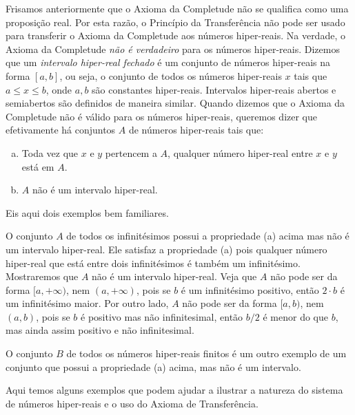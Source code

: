 Frisamos anteriormente que o Axioma da Completude não se qualifica como
uma proposição real. Por esta razão, o Princípio da Transferência não
pode ser usado para transferir o Axioma da Completude aos números
hiper-reais. Na verdade, o Axioma da Completude \emph{não é verdadeiro}
para os números hiper-reais. Dizemos que um \emph{intervalo hiper-real
fechado} é um conjunto de números hiper-reais na forma $[a,b]$, ou seja,
o conjunto de todos os números hiper-reais $x$ tais que $a \le x \le b$,
onde $a, b$ são constantes hiper-reais. Intervalos hiper-reais abertos
e semiabertos são definidos de maneira similar. Quando dizemos que o
Axioma da Completude não é válido para os números hiper-reais, queremos
dizer que efetivamente há conjuntos $A$ de números hiper-reais tais que:

\begin{enumerate}[(a)]
\item Toda vez que $x$ e $y$ pertencem a $A$, qualquer número hiper-real
entre $x$ e $y$ está em $A$.
\item $A$ não é um intervalo hiper-real.
\end{enumerate}

Eis aqui dois exemplos bem familiares.

\begin{example}
O conjunto $A$ de todos os infinitésimos possui a propriedade (a) acima
mas não é um intervalo hiper-real. Ele satisfaz a propriedade (a) pois
qualquer número hiper-real que está entre dois infinitésimos é também um
infinitésimo. Mostraremos que $A$ não é um intervalo hiper-real. Veja que
$A$ não pode ser da forma $[a,+\infty)$, nem $(a,+\infty)$, pois se $b$
é um infinitésimo positivo, então $2 \cdot b$ é um infinitésimo maior.
Por outro lado, $A$ não pode ser da forma $[a,b)$, nem $(a,b)$, pois se
$b$ é positivo mas não infinitesimal, então $b/2$ é menor do que $b$, mas
ainda assim positivo e não infinitesimal.
\end{example}

O conjunto $B$ de todos os números hiper-reais finitos é um outro exemplo
de um conjunto que possui a propriedade (a) acima, mas não é um intervalo.

Aqui temos alguns exemplos que podem ajudar a ilustrar a natureza do
sistema de números hiper-reais e o uso do Axioma de Transferência.

